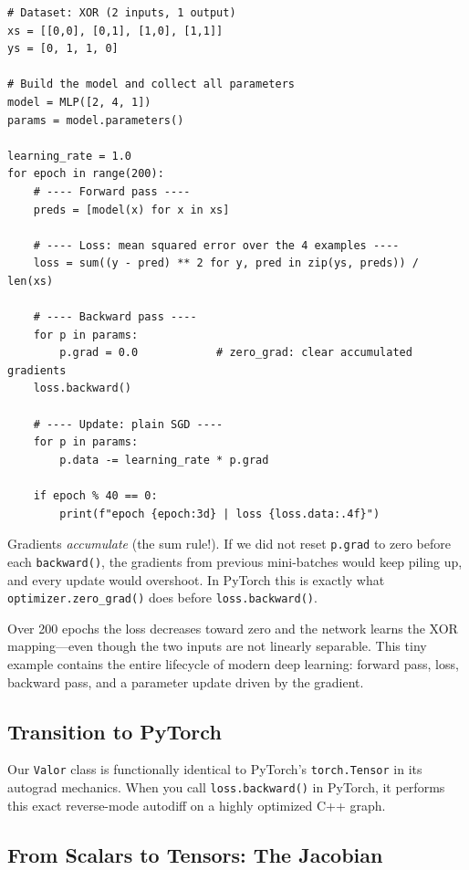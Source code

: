 \documentclass{tufte-handout}
\let\subsubsection\subsection
\begin{document}
\begin{lstlisting}[caption={Training a 2-4-1 MLP on XOR. Each step is a mini-batch update via SGD.}]
# Dataset: XOR (2 inputs, 1 output)
xs = [[0,0], [0,1], [1,0], [1,1]]
ys = [0, 1, 1, 0]

# Build the model and collect all parameters
model = MLP([2, 4, 1])
params = model.parameters()

learning_rate = 1.0
for epoch in range(200):
    # ---- Forward pass ----
    preds = [model(x) for x in xs]

    # ---- Loss: mean squared error over the 4 examples ----
    loss = sum((y - pred) ** 2 for y, pred in zip(ys, preds)) / len(xs)

    # ---- Backward pass ----
    for p in params:
        p.grad = 0.0            # zero_grad: clear accumulated gradients
    loss.backward()

    # ---- Update: plain SGD ----
    for p in params:
        p.data -= learning_rate * p.grad

    if epoch % 40 == 0:
        print(f"epoch {epoch:3d} | loss {loss.data:.4f}")
\end{lstlisting}

\begin{remark}
Gradients \emph{accumulate} (the sum rule!). If we did not reset \texttt{p.grad} to zero before each \texttt{backward()}, the gradients from previous mini-batches would keep piling up, and every update would overshoot. In PyTorch this is exactly what \texttt{optimizer.zero\_grad()} does before \texttt{loss.backward()}.
\end{remark}

Over 200 epochs the loss decreases toward zero and the network learns the XOR mapping---even though the two inputs are not linearly separable. This tiny example contains the entire lifecycle of modern deep learning: forward pass, loss, backward pass, and a parameter update driven by the gradient.

\subsection{Transition to PyTorch}

Our \texttt{Valor} class is functionally identical to PyTorch's \texttt{torch.Tensor} in its autograd mechanics. When you call \texttt{loss.backward()} in PyTorch, it performs this exact reverse-mode autodiff on a highly optimized C++ graph. 

\subsubsection{From Scalars to Tensors: The Jacobian}
\end{document}
